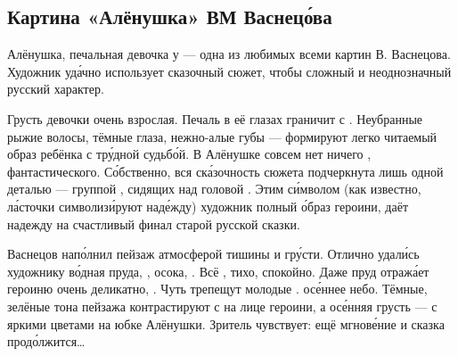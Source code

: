 \subsection{Картина «Алёнушка» ВМ Васнец\'{о}ва}

Алёнушка, печальная девочка у  --- одна из любимых всеми картин В. Васнецова. Художник уд\'{а}чно использует сказочный сюжет, чтобы  сложный и неоднозначный русский характер.

Грусть девочки очень взрослая. Печаль в её глазах граничит с . Неубранные рыжие волосы, тёмные глаза, нежно-алые губы --- формируют легко читаемый образ ребёнка с тр\'{у}дной судьб\'{о}й.
В Алёнушке совсем нет ничего , фантастического.
С\'{о}бственно, вся ск\'{а}зочность сюжета подчеркнута лишь одной деталью --- группой , сидящих над головой . Этим с\'{и}мволом (как известно, л\'{а}сточки символиз\'{и}руют над\'{е}жду) художник  полный  \'{о}браз героини, даёт надежду на счастливый финал старой русской сказки.

Васнецов нап\'{о}лнил  пейзаж атмосферой тишины и гр\'{у}сти.
Отлично удал\'{и}сь художнику в\'{о}дная  пруда, , осока, .
Всё , тихо, спокойно.
Даже пруд отраж\'{а}ет героиню очень деликатно, .
Чуть трепещут молодые .   ос\'{е}ннее небо.
Тёмные, зелёные тона пейзажа контрастируют с  на лице героини, а ос\'{е}нняя грусть --- с яркими цветами на юбке Алёнушки. Зритель чувствует: ещё мгнов\'{е}ние и сказка прод\'{о}лжится\dots







